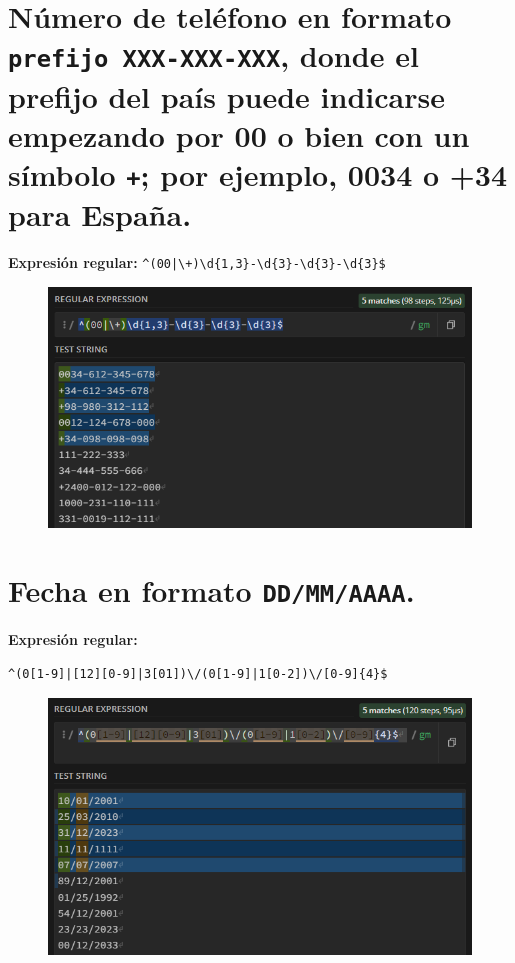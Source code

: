 \documentclass[11pt]{report}
\begin{document}
\section{Número de teléfono en formato \texttt{prefijo XXX-XXX-XXX}, donde el prefijo del país puede indicarse empezando por 00 o bien con un símbolo \texttt{+}; por ejemplo, 0034 o +34 para España.}
\textbf{Expresión regular:} \texttt{\textasciicircum(00|\textbackslash+)\textbackslash d\{1,3\}-\textbackslash d\{3\}-\textbackslash d\{3\}-\textbackslash d\{3\}\$}
  \begin{figure}[H]
    \centering
    \includegraphics[scale=0.75]{img/op_extendidos_07.png}
  \end{figure}

\section{Fecha en formato \texttt{DD/MM/AAAA}.}
\textbf{Expresión regular:}
\begin{verbatim}
^(0[1-9]|[12][0-9]|3[01])\/(0[1-9]|1[0-2])\/[0-9]{4}$
\end{verbatim}
  \begin{figure}[H]
    \centering
    \includegraphics[scale=0.75]{img/op_extendidos_08.png}
  \end{figure}
\end{document}
